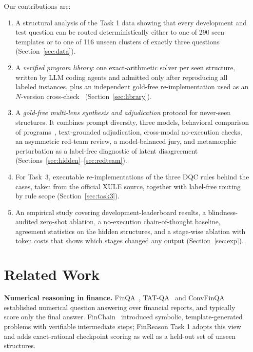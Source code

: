 \documentclass[conference]{IEEEtran}
\begin{document}
Our contributions are:
\begin{enumerate}
\item A structural analysis of the Task 1 data showing that every development and test question can be routed
deterministically either to one of 290 seen templates or to one of 116 unseen clusters of exactly three questions
(Section~\ref{sec:data}).
\item A \emph{verified program library}: one exact-arithmetic solver per seen structure, written by LLM coding agents and
admitted only after reproducing all labeled instances, plus an independent gold-free re-implementation used as an
$N$-version cross-check~\cite{avizienis1985nversion} (Section~\ref{sec:library}).
\item A \emph{gold-free multi-lens synthesis and adjudication} protocol for never-seen structures. It combines prompt
diversity, three models, behavioral comparison of programs~\cite{li2022alphacode,chen2023codet},
text-grounded adjudication, cross-modal no-execution checks, an asymmetric red-team review, a model-balanced jury, and
metamorphic perturbation as a label-free diagnostic of latent disagreement
(Sections~\ref{sec:hidden}--\ref{sec:redteam}).
\item For Task~3, executable re-implementations of the three DQC rules behind the cases, taken from the official XULE
source, together with label-free routing by rule scope (Section~\ref{sec:task3}).
\item An empirical study covering development-leaderboard results, a blindness-audited zero-shot ablation, a
no-execution chain-of-thought baseline, agreement statistics on the hidden structures, and a stage-wise ablation with
token costs that shows which stages changed any output (Section~\ref{sec:exp}).
\end{enumerate}

\section{Related Work}
\textbf{Numerical reasoning in finance.} FinQA~\cite{chen2021finqa}, TAT-QA~\cite{zhu2021tatqa} and
ConvFinQA~\cite{chen2022convfinqa} established numerical question answering over financial reports, and typically
score only the final answer. FinChain~\cite{xie-etal-2026-finchain} introduced symbolic, template-generated problems with
verifiable intermediate steps; FinReason Task 1 adopts this view and adds exact-rational checkpoint scoring as well as a
held-out set of unseen structures.
\end{document}
